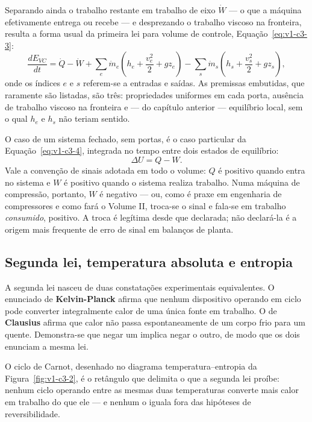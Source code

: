 \documentclass[12pt,a4paper]{article}
\numberwithin{equation}{section}
\numberwithin{table}{section}
\numberwithin{figure}{section}
\begin{document}
Separando ainda o trabalho restante em trabalho de eixo $\dot{W}$ --- o que a
máquina efetivamente entrega ou recebe --- e desprezando o trabalho viscoso na
fronteira, resulta a forma usual da primeira lei para volume de controle,
Equação~\eqref{eq:v1-c3-3}:
\begin{equation}\label{eq:v1-c3-3}
\frac{dE_{VC}}{dt} = \dot{Q} - \dot{W} +
\sum_{e}\dot{m}_e\!\left(h_e + \frac{v_e^2}{2} + gz_e\right) -
\sum_{s}\dot{m}_s\!\left(h_s + \frac{v_s^2}{2} + gz_s\right),
\end{equation}
onde os índices $e$ e $s$ referem-se a entradas e saídas. As premissas
embutidas, que raramente são listadas, são três: propriedades uniformes em cada
porta, ausência de trabalho viscoso na fronteira e --- do capítulo anterior ---
equilíbrio local, sem o qual $h_e$ e $h_s$ não teriam sentido.

O caso de um sistema fechado, sem portas, é o caso particular da
Equação~\eqref{eq:v1-c3-4}, integrada no tempo entre dois estados de
equilíbrio:
\begin{equation}\label{eq:v1-c3-4}
\Delta U = Q - W .
\end{equation}
Vale a convenção de sinais adotada em todo o volume: $Q$ é positivo quando
entra no sistema e $W$ é positivo quando o sistema realiza trabalho. Numa
máquina de compressão, portanto, $W$ é negativo --- ou, como é praxe em
engenharia de compressores e como fará o Volume II, troca-se o sinal e fala-se
em trabalho \emph{consumido}, positivo. A troca é legítima desde que
declarada; não declará-la é a origem mais frequente de erro de sinal em
balanços de planta.

\subsection{Segunda lei, temperatura absoluta e entropia}\label{sub:v1-c3-segunda}

A segunda lei nasceu de duas constatações experimentais equivalentes.
O enunciado de \textbf{Kelvin-Planck} afirma que nenhum dispositivo operando em
ciclo pode converter integralmente calor de uma única fonte em trabalho. O de
\textbf{Clausius} afirma que calor não passa espontaneamente de um corpo frio
para um quente. Demonstra-se que negar um implica negar o outro, de modo que os
dois enunciam a mesma lei.

O ciclo de Carnot, desenhado no diagrama temperatura--entropia da
Figura~\ref{fig:v1-c3-2}, é o retângulo que delimita o que a segunda lei
proíbe: nenhum ciclo operando entre as mesmas duas temperaturas converte mais
calor em trabalho do que ele --- e nenhum o iguala fora das hipóteses de
reversibilidade.
\end{document}
